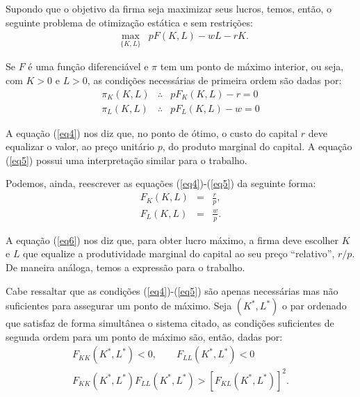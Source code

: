 \documentclass[preprintnumbers,nofootinbib,amsmath,amssymb,12pt]{article}
\begin{document}
Supondo que o objetivo da firma seja maximizar seus lucros, temos, então, o seguinte problema de otimização estática e sem restrições:
\begin{eqnarray}
&\max_{\{K,L\}}& pF(K,L) - wL - rK.
\end{eqnarray}

Se $F$ é uma função diferenciável e $\pi$ tem um ponto de máximo interior, ou seja, com $K>0$ e $L>0$, as condições necessárias de primeira ordem são dadas por:
\begin{eqnarray}
\pi_K(K,L) &\therefore& pF_K(K,L) - r = 0 \label{eq4} \\
\pi_L(K,L) &\therefore& pF_L(K,L) - w = 0 \label{eq5}
\end{eqnarray}

A equação (\ref{eq4}) nos diz que, no ponto de ótimo, o custo do capital $r$ deve equalizar o valor, ao preço unitário $p$, do produto marginal do capital. A equação (\ref{eq5}) possui uma interpretação similar para o trabalho.

Podemos, ainda, reescrever as equações (\ref{eq4})-(\ref{eq5}) da seguinte forma:
\begin{eqnarray}
F_K(K,L) &=& \frac{r}{p}, \label{eq6} \\
F_L(K,L) &=& \frac{w}{p}. \label{eq7}
\end{eqnarray}

A equação (\ref{eq6}) nos diz que, para obter lucro máximo, a firma deve escolher $K$ e $L$ que equalize a produtividade marginal do capital ao seu preço ``relativo'', $r/p$. De maneira análoga, temos a expressão para o trabalho.

Cabe ressaltar que as condições (\ref{eq4})-(\ref{eq5}) são apenas necessárias mas não suficientes para assegurar um ponto de máximo. Seja $(K^*, L^*)$ o par ordenado que satisfaz de forma simultânea o sistema citado, as condições suficientes de segunda ordem para um ponto de máximo são, então, dadas por:
\begin{eqnarray*}
F_{KK}(K^*, L^*) < 0, \qquad F_{LL}(K^*, L^*) < 0 \\
F_{KK}(K^*, L^*)F_{LL}(K^*, L^*) > [F_{KL}(K^*, L^*)]^2.
\end{eqnarray*}
\end{document}
